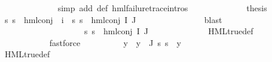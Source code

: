 \begin{isabellebody}
\ \ \ \ \ \ \ \ \ \ \ \ \isamarkupfalse%
\ {\isacharparenleft}{\kern0pt}simp\ add{\isacharcolon}{\kern0pt}\ {\isasymPsi}{\isacharunderscore}{\kern0pt}def\ hml{\isacharunderscore}{\kern0pt}failure{\isacharunderscore}{\kern0pt}trace{\isachardot}{\kern0pt}intros{\isacharparenleft}{\kern0pt}{}{\isacharparenright}{\kern0pt}{\isacharparenright}{\kern0pt}\isanewline
\ \ \ \ \ \ \ \ \ \ \isamarkupfalse%
\ \isamarkupfalse%
\ {\isacharquery}{\kern0pt}thesis\ \isamarkupfalse%
\ {\isacartoucheopen}{\isasymforall}s{\isachardot}{\kern0pt}\ {\isasymnot}{\isacharparenleft}{\kern0pt}s\ {\isasymTurnstile}\ hml{\isacharunderscore}{\kern0pt}conj\ {\isacharbraceleft}{\kern0pt}{\isacharbraceright}{\kern0pt}\ {\isacharbraceleft}{\kern0pt}i{\isacharunderscore}{\kern0pt}{\isasymphi}{\isacharbraceright}{\kern0pt}\ {\isasymPsi}{\isacharparenright}{\kern0pt}{\isacartoucheclose}\ {\isacartoucheopen}{\isasymforall}s{\isachardot}{\kern0pt}\ {\isasymnot}{\isacharparenleft}{\kern0pt}s\ {\isasymTurnstile}\ hml{\isacharunderscore}{\kern0pt}conj\ I\ J\ {\isasymPhi}{\isacharparenright}{\kern0pt}{\isacartoucheclose}\ \isanewline
\ \ \ \ \ \ \ \ \ \ \ \ \isamarkupfalse%
\ blast\isanewline
\ \ \ \ \ \ \ \ \isamarkupfalse%
\isanewline
\ \ \ \ \ \ \isamarkupfalse%
\isanewline
\ \ \ \ \ \ \ \ \isamarkupfalse%
\ {}\isanewline
\ \ \ \ \ \ \ \ \isamarkupfalse%
\ {\isachardoublequoteopen}{\isasymforall}s{\isachardot}{\kern0pt}\ {\isasymnot}s\ {\isasymTurnstile}\ {\isacharparenleft}{\kern0pt}hml{\isacharunderscore}{\kern0pt}conj\ I\ J\ {\isasymPhi}{\isacharparenright}{\kern0pt}{\isachardoublequoteclose}\ \isanewline
\ \ \ \ \ \ \ \ \ \ \isamarkupfalse%
\ HML{\isacharunderscore}{\kern0pt}true{\isacharunderscore}{\kern0pt}def\ \isanewline
\ \ \ \ \ \ \ \ \ \ \isamarkupfalse%
\ fastforce\isanewline
\ \ \ \ \ \ \ \ \isamarkupfalse%
\ y\ \ {\isachardoublequoteopen}y\ {\isasymin}\ {\isasymPhi}{\isacharbackquote}{\kern0pt}J{\isachardoublequoteclose}\ {\isachardoublequoteopen}{\isacharparenleft}{\kern0pt}{\isasymforall}s{\isachardot}{\kern0pt}\ s\ {\isasymTurnstile}\ y{\isacharparenright}{\kern0pt}{\isachardoublequoteclose}\ \isanewline
\ \ \ \ \ \ \ \ \ \ \isamarkupfalse%
\ {\isachardoublequoteopen}{}{\isachardoublequoteclose}\isanewline
\ \ \ \ \ \ \ \ \ \ \isamarkupfalse%
\ HML{\isacharunderscore}{\kern0pt}true{\isacharunderscore}{\kern0pt}def\ \isanewline

\end{isabellebody}
